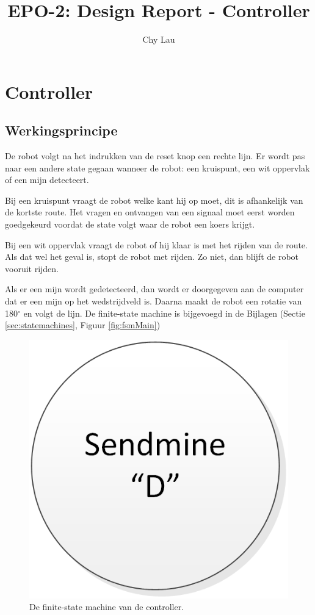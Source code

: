 \documentclass{report}
\title{EPO-2: Design Report - Controller}
\author{Chy Lau}
\begin{document}
\chapter{Controller}
\label{ch:controller}

\section{Werkingsprincipe}
De robot volgt na het indrukken van de reset knop een rechte lijn.
Er wordt pas naar een andere state gegaan wanneer de robot: een kruispunt, een wit oppervlak of een mijn detecteert.


Bij een kruispunt vraagt de robot welke kant hij op moet, dit is afhankelijk van de kortste route.
Het vragen en ontvangen van een signaal moet eerst worden goedgekeurd voordat de state volgt waar de robot een koers krijgt.


Bij een wit oppervlak vraagt de robot of hij klaar is met het rijden van de route.
Als dat wel het geval is, stopt de robot met rijden.
Zo niet, dan blijft de robot vooruit rijden.

Als er een mijn wordt gedetecteerd, dan wordt er doorgegeven aan de computer dat er een mijn op het wedstrijdveld is.
Daarna maakt de robot een rotatie van 180$^\circ$ en volgt de lijn.
De finite-state machine is bijgevoegd in de Bijlagen (Sectie \ref{sec:statemachines}, Figuur \ref{fig:fsmMain})

\begin{figure}
\centering
\includegraphics[scale=0.5]{../bijlagen/FSMMain.png}
\caption{De finite-state machine van de controller.}
\label{fig:fsmmain}
\end{figure}
\end{document}
